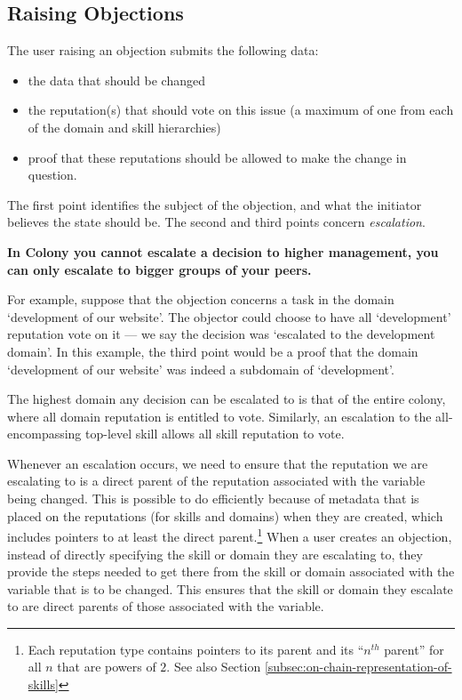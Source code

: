 \subsection{Raising Objections}\label{subsec:raising-objections}

The user raising an objection submits the following data:
\begin{itemize}
 \item the data that should be changed
 \item the reputation(s) that should vote on this issue (a maximum of one from each of the domain and skill hierarchies)
 \item proof that these reputations should be allowed to make the change in question. 
\end{itemize}

The first point identifies the subject of the objection, and what the initiator believes the state should be. The second and third points concern \emph{escalation}. 

\begin{center}
 \textbf{In Colony you cannot escalate a decision to higher management, you can only escalate to bigger groups of your peers.}
\end{center}

For example, suppose that the objection concerns a task in the domain `development of our website'. The objector could choose to have all `development' reputation vote on it --- we say the decision was `escalated to the development domain'. In this example, the third point would be a proof that the domain `development of our website' was indeed a subdomain of `development'.

The highest domain any decision can be escalated to is that of the entire colony, where all domain reputation is entitled to vote. Similarly, an escalation to the all-encompassing top-level skill allows all skill reputation to vote.

Whenever an escalation occurs, we need to ensure that the reputation we are escalating to is a direct parent of the reputation associated with the variable being changed. This is possible to do efficiently because of metadata that is placed on the reputations (for skills and domains) when they are created, which includes pointers to at least the direct parent.\footnote{Each reputation type contains pointers to its parent  and its ``$n^{th}$ parent''  for all $n$ that are powers of $2$. See also Section \ref{subsec:on-chain-representation-of-skills}} When a user creates an objection, instead of directly specifying the skill or domain they are escalating to, they provide the steps needed to get there from the skill or domain associated with the variable that is to be changed. This ensures that the skill or domain they escalate to are direct parents of those associated with the variable.

